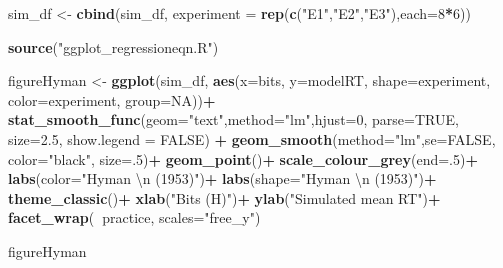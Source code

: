 \documentclass[,man,floatsintext]{apa6}
\newenvironment{Shaded}{\begin{snugshade}}{\end{snugshade}}
\newcommand{\CharTok}[1]{\textcolor[rgb]{0.31,0.60,0.02}{#1}}
\newcommand{\DataTypeTok}[1]{\textcolor[rgb]{0.13,0.29,0.53}{#1}}
\newcommand{\DecValTok}[1]{\textcolor[rgb]{0.00,0.00,0.81}{#1}}
\newcommand{\FloatTok}[1]{\textcolor[rgb]{0.00,0.00,0.81}{#1}}
\newcommand{\KeywordTok}[1]{\textcolor[rgb]{0.13,0.29,0.53}{\textbf{#1}}}
\newcommand{\NormalTok}[1]{#1}
\newcommand{\OperatorTok}[1]{\textcolor[rgb]{0.81,0.36,0.00}{\textbf{#1}}}
\newcommand{\OtherTok}[1]{\textcolor[rgb]{0.56,0.35,0.01}{#1}}
\newcommand{\StringTok}[1]{\textcolor[rgb]{0.31,0.60,0.02}{#1}}
\begin{document}
\begin{Shaded}
\begin{Highlighting}[]
\NormalTok{sim_df <-}\StringTok{ }\KeywordTok{cbind}\NormalTok{(sim_df,}
                \DataTypeTok{experiment =} \KeywordTok{rep}\NormalTok{(}\KeywordTok{c}\NormalTok{(}\StringTok{"E1"}\NormalTok{,}\StringTok{"E2"}\NormalTok{,}\StringTok{"E3"}\NormalTok{),}\DataTypeTok{each=}\DecValTok{8}\OperatorTok{*}\DecValTok{6}\NormalTok{))}

\KeywordTok{source}\NormalTok{(}\StringTok{"ggplot_regressioneqn.R"}\NormalTok{)}

\NormalTok{figureHyman <-}\StringTok{ }\KeywordTok{ggplot}\NormalTok{(sim_df, }\KeywordTok{aes}\NormalTok{(}\DataTypeTok{x=}\NormalTok{bits,}
                                  \DataTypeTok{y=}\NormalTok{modelRT,}
                                  \DataTypeTok{shape=}\NormalTok{experiment,}
                                  \DataTypeTok{color=}\NormalTok{experiment, }
                                  \DataTypeTok{group=}\OtherTok{NA}\NormalTok{))}\OperatorTok{+}
\StringTok{  }\KeywordTok{stat_smooth_func}\NormalTok{(}\DataTypeTok{geom=}\StringTok{"text"}\NormalTok{,}\DataTypeTok{method=}\StringTok{"lm"}\NormalTok{,}\DataTypeTok{hjust=}\DecValTok{0}\NormalTok{,}
                   \DataTypeTok{parse=}\OtherTok{TRUE}\NormalTok{,}
                   \DataTypeTok{size=}\FloatTok{2.5}\NormalTok{, }\DataTypeTok{show.legend =} \OtherTok{FALSE}\NormalTok{) }\OperatorTok{+}
\StringTok{  }\KeywordTok{geom_smooth}\NormalTok{(}\DataTypeTok{method=}\StringTok{"lm"}\NormalTok{,}\DataTypeTok{se=}\OtherTok{FALSE}\NormalTok{, }\DataTypeTok{color=}\StringTok{"black"}\NormalTok{, }\DataTypeTok{size=}\NormalTok{.}\DecValTok{5}\NormalTok{)}\OperatorTok{+}
\StringTok{  }\KeywordTok{geom_point}\NormalTok{()}\OperatorTok{+}
\StringTok{  }\KeywordTok{scale_colour_grey}\NormalTok{(}\DataTypeTok{end=}\NormalTok{.}\DecValTok{5}\NormalTok{)}\OperatorTok{+}
\StringTok{  }\KeywordTok{labs}\NormalTok{(}\DataTypeTok{color=}\StringTok{"Hyman }\CharTok{\textbackslash{}n}\StringTok{ (1953)"}\NormalTok{)}\OperatorTok{+}
\StringTok{  }\KeywordTok{labs}\NormalTok{(}\DataTypeTok{shape=}\StringTok{"Hyman }\CharTok{\textbackslash{}n}\StringTok{ (1953)"}\NormalTok{)}\OperatorTok{+}
\StringTok{  }\KeywordTok{theme_classic}\NormalTok{()}\OperatorTok{+}
\StringTok{  }\KeywordTok{xlab}\NormalTok{(}\StringTok{"Bits (H)"}\NormalTok{)}\OperatorTok{+}
\StringTok{  }\KeywordTok{ylab}\NormalTok{(}\StringTok{"Simulated mean RT"}\NormalTok{)}\OperatorTok{+}
\StringTok{  }\KeywordTok{facet_wrap}\NormalTok{(}\OperatorTok{~}\NormalTok{practice, }\DataTypeTok{scales=}\StringTok{"free_y"}\NormalTok{)}
  

\NormalTok{figureHyman}
\end{Highlighting}
\end{Shaded}
\end{document}
